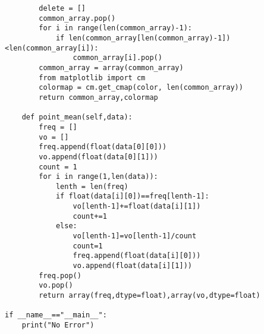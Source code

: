 \begin{verbatim}
        delete = []
        common_array.pop()
        for i in range(len(common_array)-1):    
            if len(common_array[len(common_array)-1])<len(common_array[i]):
                common_array[i].pop()
        common_array = array(common_array)
        from matplotlib import cm
        colormap = cm.get_cmap(color, len(common_array))
        return common_array,colormap
        
    def point_mean(self,data):
        freq = []
        vo = []
        freq.append(float(data[0][0]))
        vo.append(float(data[0][1]))
        count = 1
        for i in range(1,len(data)):
            lenth = len(freq)
            if float(data[i][0])==freq[lenth-1]:
                vo[lenth-1]+=float(data[i][1])
                count+=1
            else:
                vo[lenth-1]=vo[lenth-1]/count
                count=1
                freq.append(float(data[i][0]))
                vo.append(float(data[i][1]))
        freq.pop()
        vo.pop()
        return array(freq,dtype=float),array(vo,dtype=float)

if __name__=="__main__":
    print("No Error")
\end{verbatim}



